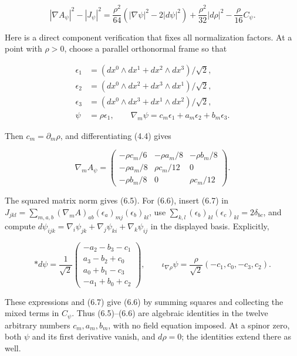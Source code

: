 \documentclass[
  10pt,
]{article}
\begin{document}
\[
 |\nabla A_\psi|^2-|J_\psi|^2
    =\frac{\rho^2}{64}(|\nabla\psi|^2-2|d\psi|^2)
      +\frac{\rho^2}{32}|d\rho|^2-\frac\rho{16}C_\psi.
 \tag{6.6}
\]

Here is a direct component verification that fixes all normalization
factors. At a point with \(\rho>0\), choose a parallel orthonormal frame
so that

\[
 \begin{aligned}
 \epsilon_1&=(dx^0\wedge dx^1+dx^2\wedge dx^3)/\sqrt2,\\
 \epsilon_2&=(dx^0\wedge dx^2+dx^3\wedge dx^1)/\sqrt2,\\
 \epsilon_3&=(dx^0\wedge dx^3+dx^1\wedge dx^2)/\sqrt2,\\
 \psi&=\rho\epsilon_1,\qquad
 \nabla_m\psi=c_m\epsilon_1+a_m\epsilon_2+b_m\epsilon_3.
 \end{aligned}
\]

Then \(c_m=\partial_m\rho\), and differentiating (4.4) gives

\[
 \nabla_m A_\psi=
 \begin{pmatrix}
  -\rho c_m/6&-\rho a_m/8&-\rho b_m/8\\
  -\rho a_m/8&\rho c_m/12&0\\
  -\rho b_m/8&0&\rho c_m/12
 \end{pmatrix}.                                         \tag{6.7}
\]

The squared matrix norm gives (6.5). For (6.6), insert (6.7) in
\(J_{jkl}=\sum_{m,a,b}(\nabla_mA)_{ab}(\epsilon_a)_{mj}(\epsilon_b)_{kl}\),
use \(\sum_{k,l}(\epsilon_b)_{kl}(\epsilon_c)_{kl}=2\delta_{bc}\), and
compute
\(d\psi_{ijk}=\nabla_i\psi_{jk}+\nabla_j\psi_{ki} +\nabla_k\psi_{ij}\)
in the displayed basis. Explicitly,

\[
 *d\psi=\frac1{\sqrt2}
 \begin{pmatrix}
  -a_2-b_3-c_1\\
   a_3-b_2+c_0\\
   a_0+b_1-c_3\\
  -a_1+b_0+c_2
 \end{pmatrix},
 \qquad
 \iota_{\nabla\rho}\psi
       =\frac{\rho}{\sqrt2}(-c_1,c_0,-c_3,c_2).
\]

These expressions and (6.7) give (6.6) by summing squares and collecting
the mixed terms in \(C_\psi\). Thus (6.5)--(6.6) are algebraic
identities in the twelve arbitrary numbers \(c_m,a_m,b_m\), with no
field equation imposed. At a spinor zero, both \(\psi\) and its first
derivative vanish, and \(d\rho=0\); the identities extend there as well.
\end{document}
